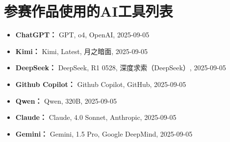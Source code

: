 \section{参赛作品使用的AI工具列表}

\begin{itemize}
    \item \textbf{ChatGPT：} GPT, o4, OpenAI, 2025-09-05
    \item \textbf{Kimi：} Kimi, Latest, 月之暗面, 2025-09-05
    \item \textbf{DeepSeek：}  DeepSeek, R1 0528, 深度求索（DeepSeek）, 2025-09-05
    \item \textbf{Github Copilot：} Github Copilot, GitHub, 2025-09-05
    \item \textbf{Qwen：} Qwen, 320B, 2025-09-05
    \item \textbf{Claude：} Claude, 4.0 Sonnet, Anthropic, 2025-09-05
    \item \textbf{Gemini：} Gemini, 1.5 Pro, Google DeepMind, 2025-09-05
\end{itemize}

\newenvironment{GPTblock}
{
    \begin{block}[colback=blue!5, colframe=blue!50, title={
        \raisebox{-.2em}{\texttt{[image: icons/openai.png]}}\hspace{0.5em}\textcolor{black}{ChatGPT}
    }]
}
{
    \vspace{0.5em}
    \begin{flushright}
        \scriptsize
        \textbf{模型使用信息：} ChatGPT，GPT，o4，OpenAI，2025-09-05
    \end{flushright}
    \end{block}
}

\newenvironment{KimiBlock}
{
    \begin{block}[colback=purple!5, colframe=purple!50, title={
        \raisebox{-.2em}{\texttt{[image: icons/kimi-color.png]}}\hspace{0.5em}\textcolor{black}{Kimi}
    }]
}
{
    \vspace{0.5em}
    \begin{flushright}
        \scriptsize
        \textbf{模型使用信息：} Kimi，Latest，月之暗面，2025-09-05
    \end{flushright}
    \end{block}
}

\newenvironment{DeepSeekBlock}
{
    \begin{block}[colback=cyan!5, colframe=cyan!50, title={
        \raisebox{-.2em}{\texttt{[image: icons/deepseek-color.png]}}\hspace{0.5em}\textcolor{black}{DeepSeek}
    }]
}
{
    \vspace{0.5em}
    \begin{flushright}
        \scriptsize
        \textbf{模型使用信息：} DeepSeek，R1 0528，深度求索（DeepSeek），2025-09-05
    \end{flushright}
    \end{block}
}

